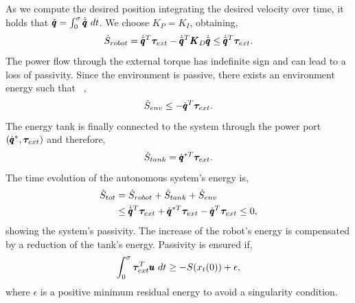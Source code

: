 As we compute the desired position integrating the desired velocity over time, it holds that $\tilde{\pmb{q}} = \int^{\sigma}_{0}
\dot{\tilde{\pmb{q}}}\ dt$. We choose $K_P = K_I$, obtaining,
\begin{equation}
    \dot{S}_{robot} = \dot{\tilde{\pmb{q}}}^T \boldsymbol{\tau}_{ext} - \dot{\tilde{\pmb{q}}}^T \pmb{K}_D \dot{\tilde{\pmb{q}}} \leq \dot{\tilde{\pmb{q}}}^T \boldsymbol{\tau}_{ext}. 
\end{equation}
The power flow through the external torque has indefinite sign and can lead to a loss of passivity. Since the environment is passive, there exists an environment energy such that ~\cite{shahriari2018valve},
\begin{equation}
    \dot{S}_{env} \leq -\dot{\pmb{q}}^T \boldsymbol{\tau}_{ext}.
\end{equation}
The energy tank is finally connected to the system through the power port $(\dot{\pmb{q}}^*, \boldsymbol{\tau}_{ext})$ and therefore,
\begin{equation} \label{eq:tank_dynamics}
\dot{S}_{tank} = \dot{\pmb{q}}^{*T} \boldsymbol{\tau}_{ext}. 
\end{equation}
The time evolution of the autonomous system's energy is,
\begin{equation}
\begin{aligned}
    \dot{S}_{tot} &= \dot{S}_{robot} + \dot{S}_{tank} + \dot{S}_{env} \\
    &\leq \dot{\tilde{\pmb{q}}}^T \boldsymbol{\tau}_{ext} + \dot{\pmb{q}}^{*T} \boldsymbol{\tau}_{ext} - \dot{\pmb{q}}^T \boldsymbol{\tau}_{ext} \leq 0,
\end{aligned}
\end{equation}
showing the system's passivity. The increase of the robot's energy is compensated by a reduction of the tank's energy. Passivity is ensured if,
\begin{equation}
    \int_{0}^{\sigma} \boldsymbol{\tau}_{ext}^T \pmb{u} \ dt \geq -S(x_t(0)) + \epsilon,
\end{equation}
where $\epsilon$ is a positive minimum residual energy to avoid a singularity condition.  

